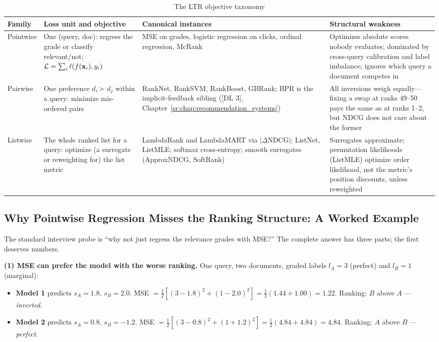 \begin{table}[H]
\centering
\small
\caption{The LTR objective taxonomy}
\label{sr:tab:ltr_taxonomy}
\begin{tabularx}{\textwidth}{lXXX}
\toprule
\textbf{Family} & \textbf{Loss unit and objective} & \textbf{Canonical instances} & \textbf{Structural weakness} \\
\midrule
Pointwise & One (query, doc): regress the grade or classify relevant/not; $\mathcal{L} = \sum_i \ell(f(\mathbf{x}_i), y_i)$ & MSE on grades, logistic regression on clicks, ordinal regression, McRank & Optimizes absolute scores nobody evaluates; dominated by cross-query calibration and label imbalance; ignores which query a document competes in \\
Pairwise & One preference $d_i \succ d_j$ within a query: minimize mis-ordered pairs & RankNet, RankSVM, RankBoost, GBRank; BPR is the implicit-feedback sibling ([DL 3], Chapter~\ref{sr:chap:recommendation_systems}) & All inversions weigh equally---fixing a swap at ranks 49--50 pays the same as at ranks 1--2, but NDCG does not care about the former \\
Listwise & The whole ranked list for a query: optimize (a surrogate or reweighting for) the list metric & LambdaRank and LambdaMART via $|\Delta\text{NDCG}|$; ListNet, ListMLE; softmax cross-entropy; smooth surrogates (ApproxNDCG, SoftRank) & Surrogates approximate; permutation likelihoods (ListMLE) optimize order likelihood, not the metric's position discounts, unless reweighted \\
\bottomrule
\end{tabularx}
\end{table}

\subsection{Why Pointwise Regression Misses the Ranking Structure: A Worked Example}

The standard interview probe is ``why not just regress the relevance grades with MSE?'' The complete answer has three parts; the first deserves numbers.

\textbf{(1) MSE can prefer the model with the worse ranking.} One query, two documents, graded labels $l_A = 3$ (perfect) and $l_B = 1$ (marginal):

\begin{itemize}
    \item \textbf{Model 1} predicts $s_A = 1.8$, $s_B = 2.0$. MSE $= \tfrac{1}{2}\left[(3-1.8)^2 + (1-2.0)^2\right] = \tfrac{1}{2}(1.44 + 1.00) = 1.22$. Ranking: $B$ above $A$ --- \textit{inverted}.
    \item \textbf{Model 2} predicts $s_A = 0.8$, $s_B = -1.2$. MSE $= \tfrac{1}{2}\left[(3-0.8)^2 + (1+1.2)^2\right] = \tfrac{1}{2}(4.84 + 4.84) = 4.84$. Ranking: $A$ above $B$ --- \textit{perfect}.
\end{itemize}


